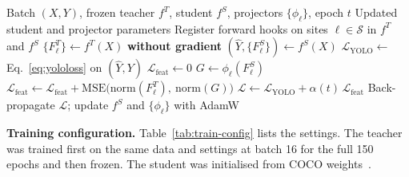 \begin{algorithm}[htbp]
\caption{One training step of feature distillation}
\label{alg:kd}
\begin{algorithmic}[1]
\Require Batch $(X,Y)$, frozen teacher $f^T$, student $f^S$, projectors $\{\phi_\ell\}$, epoch $t$
\Ensure Updated student and projector parameters
\State Register forward hooks on sites $\ell\in\mathcal{S}$ in $f^T$ and $f^S$
\State $\{F^T_\ell\} \gets f^T(X)$ \textbf{without gradient} 
\State $(\hat Y, \{F^S_\ell\}) \gets f^S(X)$
\State $\mathcal{L}_{\text{YOLO}} \gets$ Eq.~\eqref{eq:yololoss} on $(\hat Y, Y)$
\State $\mathcal{L}_{\text{feat}} \gets 0$
    \State $G \gets \phi_\ell(F^S_\ell)$ 
    \State $\mathcal{L}_{\text{feat}} \gets \mathcal{L}_{\text{feat}} + \mathrm{MSE}\big(\mathrm{norm}(F^T_\ell),\ \mathrm{norm}(G)\big)$ 
\EndFor
\State $\mathcal{L} \gets \mathcal{L}_{\text{YOLO}} + \alpha(t)\,\mathcal{L}_{\text{feat}}$ 
\State Back-propagate $\mathcal{L}$; update $f^S$ and $\{\phi_\ell\}$ with AdamW
\end{algorithmic}
\end{algorithm}

\noindent\textbf{Training configuration.} Table~\ref{tab:train-config} lists the settings. The teacher was trained first on the same data and settings at batch 16 for the full 150 epochs and then frozen. The student was initialised from COCO weights~\cite{lin2014coco}.

